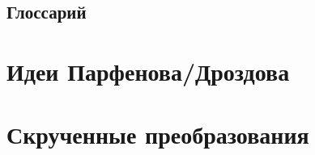 



\tableofcontents

\newpage
\section{Глоссарий}



\newpage
\chapter{Идеи Парфенова/Дроздова}



\newpage
\chapter{Скрученные преобразования}

\newpage
\printbibliography


